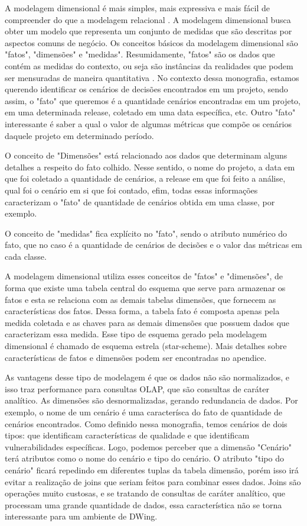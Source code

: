 A modelagem dimensional é mais simples, mais expressiva e mais fácil de compreender do que a modelagem relacional \cite{ballard1998}. A modelagem dimensional busca obter um modelo que representa um conjunto de medidas que são descritas por aspectos comuns de negócio.
%
Os conceitos básicos da modelagem dimensional são "fatos", "dimensões" e "medidas". Resumidamente, "fatos" são os dados que contém as medidas do contexto, ou seja são instâncias da realidades que podem ser mensuradas de maneira quantitativa \cite{kimball2002}. No contexto dessa monografia, estamos querendo identificar os cenários de decisões encontrados em um projeto, sendo assim, o "fato" que queremos é a quantidade cenários encontradas em um projeto, em uma determinada release, coletado em uma data específica, etc. Outro "fato" interessante é saber a qual o valor de algumas métricas que compõe os cenários daquele projeto em determinado período. 

O conceito de "Dimensões" está relacionado aos dados que determinam alguns detalhes a respeito do fato colhido. Nesse sentido, o nome do projeto, a data em que foi coletado a quantidade de cenários, a release em que foi feito a análise, qual foi o cenário em si que foi contado, efim, todas essas informações caracterizam o "fato" de quantidade de cenários obtida em uma classe, por exemplo.  


O conceito de "medidas" fica explícito no "fato", sendo o atributo numérico do fato, que no caso é a quantidade de cenários de decisões e o valor das métricas em cada classe. 


A modelagem dimensional utiliza esses conceitos de "fatos" e "dimensões", de forma que existe uma tabela central do esquema que serve para armazenar os fatos e esta se relaciona com as demais tabelas dimensões, que fornecem as características dos fatos. Dessa forma, a tabela fato é composta apenas pela medida coletada e as chaves para as demais dimensões que possuem dados que caracterizam essa medida. Esse tipo de esquema gerado pela modelagem dimensional é chamado de esquema estrela (star-scheme). Mais detalhes sobre características de fatos e dimensões podem ser encontradas no apendice.



As vantagens desse tipo de modelagem é que os dados não são normalizados, e isso traz performance para consultas OLAP, que são consultas de caráter analítico. As dimensões são desnormalizadas, gerando redundancia de dados. Por exemplo, o nome de um cenário é uma caracterísca do fato de quantidade de cenários encontrados. Como definido nessa monografia, temos cenários de dois tipos: que identificam características de qualidade e que identificam vulnerabilidades específicas. Logo, podemos perceber que a dimensão "Cenário" terá atributos como o nome do cenário e tipo do cenário. O atributo "tipo do cenário" ficará repedindo em diferentes tuplas da tabela dimensão, porém isso irá evitar a realização de joins que seriam feitos para combinar esses dados. Joins são operações muito custosas, e se tratando de consultas de caráter analítico, que processam uma grande quantidade de dados, essa característica não se torna interessante para um ambiente de DWing.



